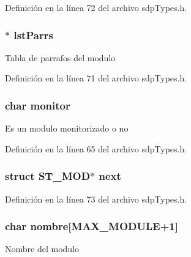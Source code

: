 Definición en la línea 72 del archivo sdp\+Types.\+h.

\hypertarget{struct_s_t___m_o_d_abab69541867571865a674d938141fcf9}{}
\subsubsection[{lst\+Parrs}]{$\ast$ lst\+Parrs}\label{struct_s_t___m_o_d_abab69541867571865a674d938141fcf9}
Tabla de parrafos del modulo 

Definición en la línea 71 del archivo sdp\+Types.\+h.

\hypertarget{struct_s_t___m_o_d_a41aafff34874651f2469d2d622a7d60d}{}
\subsubsection[{monitor}]{\setlength{\rightskip}{0pt plus 5cm}char monitor}\label{struct_s_t___m_o_d_a41aafff34874651f2469d2d622a7d60d}
Es un modulo monitorizado o no 

Definición en la línea 65 del archivo sdp\+Types.\+h.

\hypertarget{struct_s_t___m_o_d_a45ca635407e332df9a3b7e72768eb926}{}
\subsubsection[{next}]{\setlength{\rightskip}{0pt plus 5cm}struct {\bf S\+T\+\_\+\+M\+O\+D}$\ast$ next}\label{struct_s_t___m_o_d_a45ca635407e332df9a3b7e72768eb926}


Definición en la línea 73 del archivo sdp\+Types.\+h.

\hypertarget{struct_s_t___m_o_d_a59b9df3193b6f874922b75715fc1bc81}{}
\subsubsection[{nombre}]{\setlength{\rightskip}{0pt plus 5cm}char nombre\mbox{[}{\bf M\+A\+X\+\_\+\+M\+O\+D\+U\+L\+E}+1\mbox{]}}\label{struct_s_t___m_o_d_a59b9df3193b6f874922b75715fc1bc81}
Nombre del modulo 

